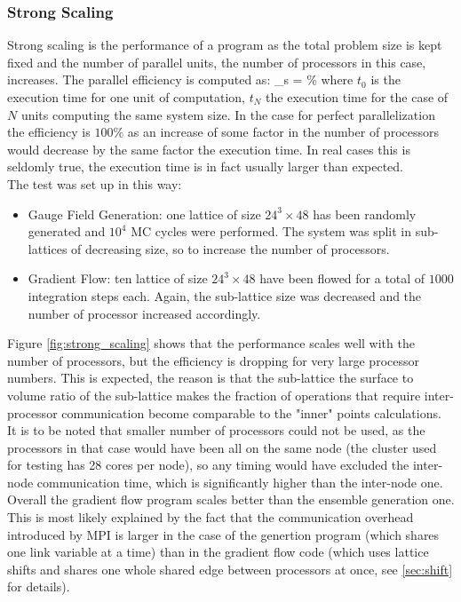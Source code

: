 \subsubsection{Strong Scaling}
Strong scaling is the performance of a program as the total problem size is kept fixed and the number of parallel units, the number of processors in this case, increases. The parallel efficiency is computed as:
\beq
    \eta_s = \% 
    \label{eq:eta_strong}
\eeq 
where $t_0$ is the execution time for one unit of computation, $t_N$ the execution time for the case of $N$ units computing the same system size. In the case for perfect parallelization the efficiency is $100\%$ as an increase of some factor in the number of processors would decrease by the same factor the execution time. In real cases this is seldomly true, the execution time is in fact usually larger than expected. \\
The test was set up in this way:
\begin{itemize}
    \item Gauge Field Generation: one lattice of size $24^3\times 48$ has been randomly generated and $10^4$ MC cycles were performed. The system was split in sub-lattices of decreasing size, so to increase the number of processors.
    \item Gradient Flow: ten lattice of size $24^3\times 48$ have been flowed for a total of $1000$ integration steps each. Again, the sub-lattice size was decreased and the number of processor increased accordingly. 
\end{itemize}


Figure \ref{fig:strong_scaling} shows that the performance scales well with the number of processors, but the efficiency is dropping for very large processor numbers. This is expected, the reason is that the sub-lattice the surface to volume ratio of the sub-lattice makes the fraction of operations that require inter-processor communication become comparable to the "inner" points calculations. It is to be noted that smaller number of processors could not be used, as the processors in that case would have been all on the same node (the cluster used for testing has 28 cores per node), so any timing would have excluded the inter-node communication time, which is significantly higher than the inter-node one.\\
Overall the gradient flow program scales better than the ensemble generation one. This is most likely explained by the fact that the communication overhead introduced by MPI is larger in the case of the genertion program (which shares one link variable at a time) than in the gradient flow code (which uses lattice shifts and shares one whole shared edge between processors at once, see \cref{sec:shift} for details).

